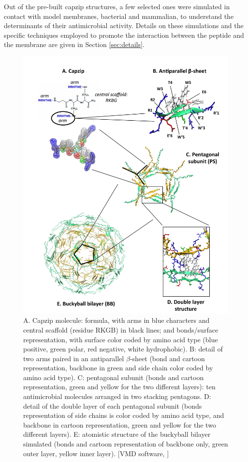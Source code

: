 Out of the pre-built capzip structures, a few selected ones were simulated in contact with model membranes, bacterial and mammalian, to understand the determinants of their antimicrobial activity. Details on these simulations and the specific techniques employed to promote the interaction between the peptide and the membrane are given in Section \ref{sec:details}.
%
\begin{figure}[p!]
\centering
	\includegraphics[width=0.95\linewidth]{3results_capsule/pics/img_build.png}
\caption[Building blocks of capzip assembly]{A. Capzip molecule: formula, with arms in blue characters and central scaffold (residue RKGB) in black lines; and bonds/surface representation, with surface color coded by amino acid type (blue positive, green polar, red negative, white hydrophobic).
%
B: detail of two arms paired in an antiparallel $\beta$-sheet (bond and cartoon representation, backbone in green and side chain color coded by amino acid type).
%
C: pentagonal subunit (bonds and cartoon representation, green and yellow for the two different layers): ten antimicrobial molecules arranged in two stacking pentagons. 
%
D: detail of the double layer of each pentagonal subunit (bonds representation of side chains is color coded by amino acid type, and backbone in cartoon representation, green and yellow for the two different layers).
%
E: atomistic structure of the buckyball bilayer simulated (bonds and cartoon representation of backbone only, green outer layer, yellow inner layer). [VMD software, \citet{HUMP96}]}
\label{fig:BTI_vmd}
\end{figure}



